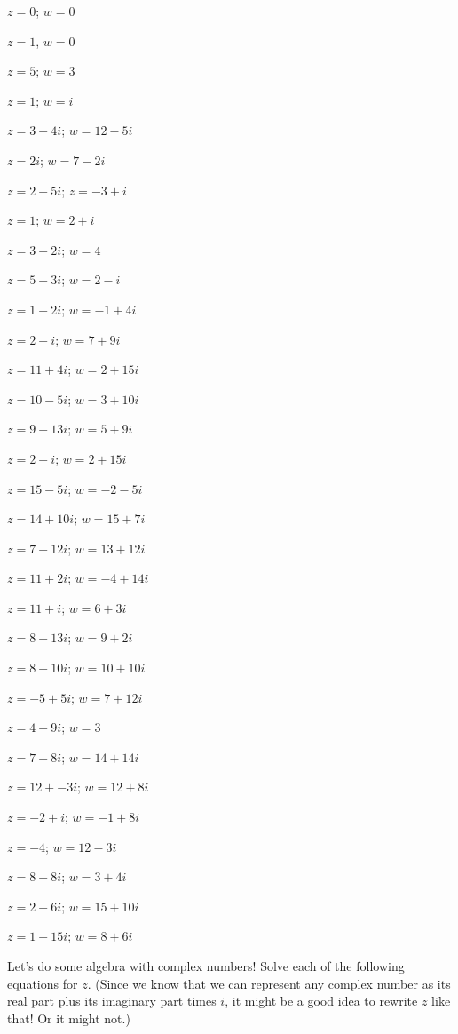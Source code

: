 \documentclass[
]{article}
\begin{document}
\begin{multicols}{3}
\setlength{\columnseprule}{.5pt}
\begin{problems}
\item $z=0$; $w=0$
\item $z=1$, $w=0$
\item $z=5$; $w=3$
\item $z=1$; $w=i$
\item $z=3+4i$; $w=12-5i$
\item $z=2i$; $w=7-2i$
\item $z=2-5i$; $z=-3+i$
\item $z=1$; $w=2+i$
\item $z=3+2i$; $w=4$
\item $z=5-3i$; $w=2-i$
\item $z=1+2i$; $w=-1+4i$
\item $z=2-i$; $w=7+9i$
\item $z=11+4i$; $w=2+15i$
\item $z=10-5i$; $w=3+10i$
\item $z=9+13i$; $w=5+9i$
\item $z=2+i$; $w=2+15i$
\item $z=15-5i$; $w=-2-5i$
\item $z=14+10i$; $w=15+7i$
\item $z=7+12i$; $w=13+12i$
\item $z=11+2i$; $w=-4+14i$
\item $z=11+i$; $w=6+3i$
\item $z=8+13i$; $w=9+2i$
\item $z=8+10i$; $w=10+10i$
\item $z=-5+5i$; $w=7+12i$
\item $z=4+9i$; $w=3$
\item $z=7+8i$; $w=14+14i$
\item $z=12+-3i$; $w=12+8i$
\item $z=-2+i$; $w=-1+8i$
\item $z=-4$; $w=12-3i$
\item $z=8+8i$; $w=3+4i$
\item $z=2+6i$; $w=15+10i$
\item $z=1+15i$; $w=8+6i$
\end{problems}
\end{multicols}

\noindent Let's do some algebra with complex numbers! Solve each of the
following equations for \(z\). (Since we know that we can represent any
complex number as its real part plus its imaginary part times \(i\), it
might be a good idea to rewrite \(z\) like that! Or it might not.)
\end{document}
